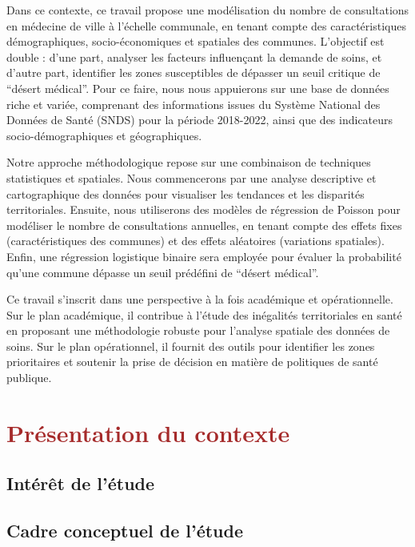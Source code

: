 \documentclass[
]{article}
\begin{document}
Dans ce contexte, ce travail propose une modélisation du nombre de
consultations en médecine de ville à l'échelle communale, en tenant
compte des caractéristiques démographiques, socio-économiques et
spatiales des communes. L'objectif est double : d'une part, analyser les
facteurs influençant la demande de soins, et d'autre part, identifier
les zones susceptibles de dépasser un seuil critique de ``désert
médical''. Pour ce faire, nous nous appuierons sur une base de données
riche et variée, comprenant des informations issues du Système National
des Données de Santé (SNDS) pour la période 2018-2022, ainsi que des
indicateurs socio-démographiques et géographiques.

Notre approche méthodologique repose sur une combinaison de techniques
statistiques et spatiales. Nous commencerons par une analyse descriptive
et cartographique des données pour visualiser les tendances et les
disparités territoriales. Ensuite, nous utiliserons des modèles de
régression de Poisson pour modéliser le nombre de consultations
annuelles, en tenant compte des effets fixes (caractéristiques des
communes) et des effets aléatoires (variations spatiales). Enfin, une
régression logistique binaire sera employée pour évaluer la probabilité
qu'une commune dépasse un seuil prédéfini de ``désert médical''.

Ce travail s'inscrit dans une perspective à la fois académique et
opérationnelle. Sur le plan académique, il contribue à l'étude des
inégalités territoriales en santé en proposant une méthodologie robuste
pour l'analyse spatiale des données de soins. Sur le plan opérationnel,
il fournit des outils pour identifier les zones prioritaires et soutenir
la prise de décision en matière de politiques de santé publique.

\newpage

\section{\texorpdfstring{\textcolor{brown} {Présentation du contexte}}{}}\label{section-1}

\subsection{Intérêt de l'étude}\label{intuxe9ruxeat-de-luxe9tude}

\subsection{Cadre conceptuel de
l'étude}\label{cadre-conceptuel-de-luxe9tude}
\end{document}
